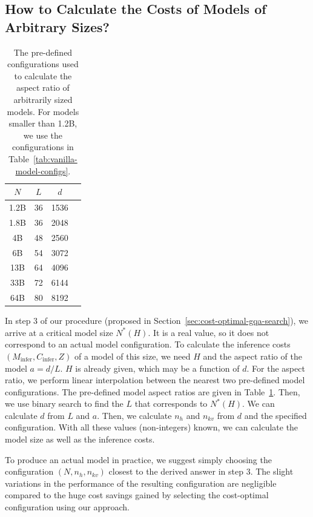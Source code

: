 \subsection{How to Calculate the Costs of Models of Arbitrary Sizes?} 
\label{sec:appendix-cost-of-arbitrary-size}

\begin{table}[!t]
    \centering
    \begin{tabular}{c|ccc}
        \toprule
        $N$ & $L$ & $d$ \\
        \midrule
        1.2B & 36 & 1536 \\
        1.8B & 36 & 2048 \\
        4B  & 48 & 2560 \\
        6B  & 54 & 3072 \\
        13B & 64 & 4096 \\
        33B & 72 & 6144 \\ 
        64B & 80 & 8192 \\
        \bottomrule
    \end{tabular}
    \caption{The pre-defined configurations used to calculate the aspect ratio of arbitrarily sized models. For models smaller than 1.2B, we use the configurations in Table~\ref{tab:vanilla-model-configs}.}
    \label{tab:aspect-ratio-configs}
\end{table}

In step 3 of our procedure (proposed in Section~\ref{sec:cost-optimal-gqa-search}), we arrive at a critical model size $N^*(H)$. It is a real value, so it does not correspond to an actual model configuration. To calculate the inference costs $(M_\text{infer}, C_\text{infer}, Z)$ of a model of this size, we need $H$ and the aspect ratio of the model $a=d/L$. $H$ is already given, which may be a function of $d$. For the aspect ratio, we perform linear interpolation between the nearest two pre-defined model configurations. The pre-defined model aspect ratios are given in Table~\ref{tab:aspect-ratio-configs}. Then, we use binary search to find the $L$ that corresponds to $N^*(H)$. We can calculate $d$ from $L$ and $a$. Then, we calculate $n_h$ and $n_{kv}$ from $d$ and the specified configuration. With all these values (non-integers) known, we can calculate the model size as well as the inference costs.

To produce an actual model in practice, we suggest simply choosing the configuration $(N,n_h,n_{kv})$ closest to the derived answer in step 3. The slight variations in the performance of the resulting configuration are negligible compared to the huge cost savings gained by selecting the cost-optimal configuration using our approach.


